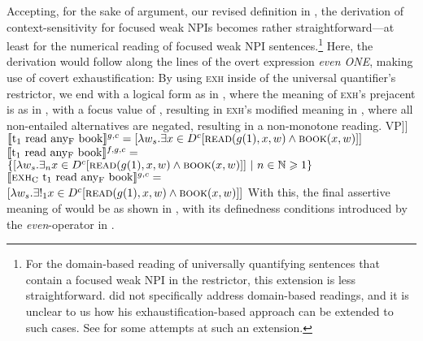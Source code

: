 Accepting, for the sake of argument, our revised definition in , the derivation of context-sensitivity for focused weak NPIs becomes rather straightforward---at least for the numerical reading of focused weak NPI sentences.\footnote{For the domain-based reading of universally quantifying sentences that contain a focused weak NPI in the restrictor, this extension is less straightforward. \textcite{Crnic2014-dogma} did not specifically address domain-based readings, and it is unclear to us how his exhaustification-based approach can be extended to such cases. See  for some attempts at such an extension.} Here, the derivation would follow along the lines of the overt expression \textit{even \MakeUppercase{one}}, making use of covert exhaustification: By using {\scshape exh} inside of the universal quantifier's restrictor, we end with a logical form as in , where the meaning of {\scshape exh}'s prejacent is as in , with a focus value of , resulting in {\scshape exh}'s modified meaning in , where all non-entailed alternatives are negated, resulting in a non-monotone reading.
\pex[nopreamble=true]%
\a[]\phantomsection [even\textsubscript{C'} [every student wh\textsubscript{1} [{\scshape exh}\textsubscript{C} t\textsubscript{1} read any\textsubscript{F} book] VP]]
\a{} $\intension[g,c]{t\textsubscript{1} read any\textsubscript{F} book}=[\lambda{w_s}.\exists{x\in{D^c}}[\predicate{read}(g(1),x,w)\land\predicate{book}(x,w)]]$
\a{} $\intension[f,g,c]{t\textsubscript{1} read any\textsubscript{F} book}=$\\\emptyfill$\{[\lambda{w_s}.\exists_n{x\in{D^c}}[\predicate{read}(g(1),x,w)\land\predicate{book}(x,w)]]~|~n\in\mathbb{N}\geqslant1\}$
\a{} $\intension[g,c]{{\scshape exh}\textsubscript{C} t\textsubscript{1} read any\textsubscript{F} book}=$\\\emptyfill$[\lambda{w_s}.\exists!_1{x\in{D^c}}[\predicate{read}(g(1),x,w)\land\predicate{book}(x,w)]]$
\xe
With this, the final assertive meaning of  would be as shown in , with its definedness conditions introduced by the \textit{even}-operator in .
